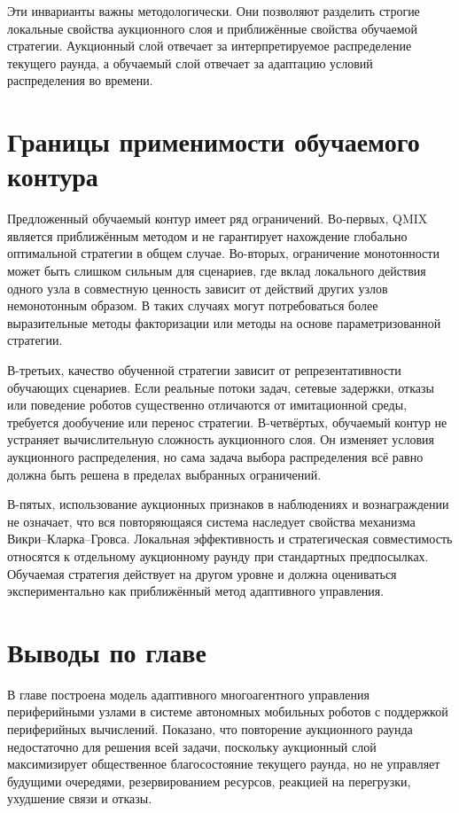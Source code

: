 Эти инварианты важны методологически. Они позволяют разделить строгие локальные свойства аукционного слоя и приближённые свойства обучаемой стратегии. Аукционный слой отвечает за интерпретируемое распределение текущего раунда, а обучаемый слой отвечает за адаптацию условий распределения во времени.

\section{Границы применимости обучаемого контура}

Предложенный обучаемый контур имеет ряд ограничений. Во-первых, QMIX является приближённым методом и не гарантирует нахождение глобально оптимальной стратегии в общем случае. Во-вторых, ограничение монотонности может быть слишком сильным для сценариев, где вклад локального действия одного узла в совместную ценность зависит от действий других узлов немонотонным образом. В таких случаях могут потребоваться более выразительные методы факторизации или методы на основе параметризованной стратегии.

В-третьих, качество обученной стратегии зависит от репрезентативности обучающих сценариев. Если реальные потоки задач, сетевые задержки, отказы или поведение роботов существенно отличаются от имитационной среды, требуется дообучение или перенос стратегии. В-четвёртых, обучаемый контур не устраняет вычислительную сложность аукционного слоя. Он изменяет условия аукционного распределения, но сама задача выбора распределения всё равно должна быть решена в пределах выбранных ограничений.

В-пятых, использование аукционных признаков в наблюдениях и вознаграждении не означает, что вся повторяющаяся система наследует свойства механизма Викри--Кларка--Гровса. Локальная эффективность и стратегическая совместимость относятся к отдельному аукционному раунду при стандартных предпосылках. Обучаемая стратегия действует на другом уровне и должна оцениваться экспериментально как приближённый метод адаптивного управления.

\section{Выводы по главе}

В главе построена модель адаптивного многоагентного управления периферийными узлами в системе автономных мобильных роботов с поддержкой периферийных вычислений. Показано, что повторение аукционного раунда недостаточно для решения всей задачи, поскольку аукционный слой максимизирует общественное благосостояние текущего раунда, но не управляет будущими очередями, резервированием ресурсов, реакцией на перегрузки, ухудшение связи и отказы.

